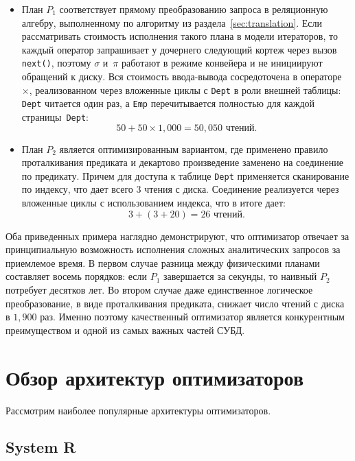 \documentclass[fontsize=14pt, russian]{scrartcl}
\begin{document}
\begin{itemize}
  \item План \(P_1\) соответствует прямому преобразованию запроса в реляционную
        алгебру, выполненному по алгоритму из раздела~\ref{sec:translation}.
        Если рассматривать стоимость исполнения такого плана в модели
        итераторов, то каждый оператор запрашивает у дочернего следующий кортеж
        через вызов \texttt{next()}, поэтому \(\sigma\) и~\(\pi\) работают в
        режиме конвейера и не инициируют обращений к диску. Вся стоимость
        ввода-вывода сосредоточена в операторе~\(\times\), реализованном через
        вложенные циклы с \texttt{Dept} в роли внешней таблицы: \texttt{Dept}
        читается один раз, а \texttt{Emp} перечитывается полностью для каждой
        страницы~\texttt{Dept}:
        \[
          50 + 50 \times 1{,}000 = 50{,}050 \text{ чтений.}
        \]

  \item План \(P_2\) является оптимизированным вариантом, где применено правило
        проталкивания предиката и декартово произведение заменено на соединение
        по предикату. Причем для доступа к таблице \texttt{Dept} применяется
        сканирование по индексу, что дает всего \(3\) чтения с диска. Соединение
        реализуется через вложенные циклы с использованием индекса, что в итоге дает:
        \[
          3 + (3 + 20) = 26 \text{ чтений.}
        \]
\end{itemize}

Оба приведенных примера наглядно демонстрируют, что оптимизатор отвечает за
принципиальную возможность исполнения сложных аналитических запросов за
приемлемое время. В первом случае разница между физическими планами составляет
восемь порядков: если \(P_1\) завершается за секунды, то наивный \(P_2\)
потребует десятков лет. Во втором случае даже единственное логическое
преобразование, в виде проталкивания предиката, снижает число чтений с диска в
\(1{,}900\) раз. Именно поэтому качественный оптимизатор является конкурентным
преимуществом и одной из самых важных частей СУБД.

\section{Обзор архитектур оптимизаторов}

Рассмотрим наиболее популярные архитектуры оптимизаторов.

\subsection{System R}
\end{document}
